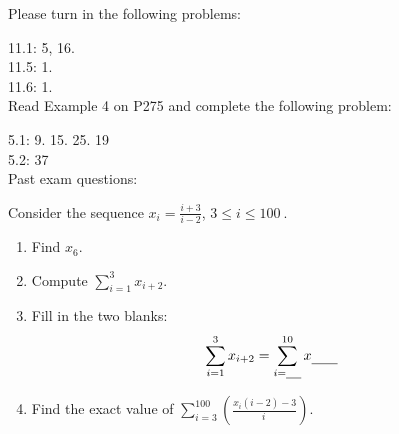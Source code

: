 \documentclass[12pt,twoside]{article}
\newcommand{\blank}[1]{\underline{\hspace{#1}}}
\newcommand{\dsst}{\displaystyle}
\begin{document}
Please turn in the following problems: 

11.1: 5, 16.\\

11.5: 1.\\

11.6: 1.\\

Read Example 4 on P275 and complete the following problem:

5.1: 9. 15. 25. 19 \\

5.2: 37\\

Past exam questions: 

Consider the sequence $x_i = \dsst\frac{i+3}{i-2}$, $3\leq i \leq 100\
$.

\begin{enumerate}
  \item Find $x_6$.

  \item Compute $\dsst\sum_{i=1}^3 x_{i+2}$.

  \item Fill in the two blanks: $$\dsst\sum_{i=1}^3 x_{i+2} = \dsst\sum_{i=\blank{0.15in}}^{10} x_{\blank{0.25in}}$$

  \item Find the exact value of $\dsst\sum_{i=3}^{100} \left(\frac{x_i(i-2)-3}{i\
}\right)$.

\end{enumerate}
\end{document}
